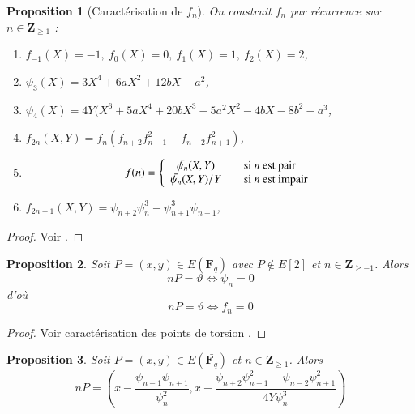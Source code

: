\documentclass{article}%
\theoremstyle{plain}
\theoremstyle{definition}
\theoremstyle{plain}
\newtheorem{proposition}{Proposition}[section]
\theoremstyle{plain}
\theoremstyle{remark}
\newcommand\fq{\mathbf{F}_{q}}
\begin{document}
\begin{proposition}[Caractérisation de $f_{n}$]
On construit $f_{n}$ par récurrence sur $n\in\mathbf{Z}_{\geq 1}$ :
\begin{enumerate}
\item $f_{-1}(X)=-1,\ f_{0}(X)=0,\ f_{1}(X)=1,\ f_{2}(X)=2$,
\item $\psi_{3}(X)=3X^{4} + 6aX^{2} + 12bX - a^{2}$,
\item $\psi_{4}(X)=4Y(X^{6} + 5aX^{4} + 20bX^{3} - 5a^{2}X^{2} - 4bX - 8b^{2} - a^{3}$,
\item $f_{2n}(X,Y)=f_{n}(f_{n+2}f_{n-1}^{2} - f_{n-2}f_{n+1}^{2})$,
\item $$
f(n) = \left\{ 
\begin{array}{cl cl}
  \bar{\psi_{n}}(X,Y) & \quad \text{si } n \text{ est pair}\\
  \bar{\psi_{n}}(X,Y)/Y & \quad \text{si } n \text{ est impair}\\ \end{array} \right.
$$
\item $f_{2n+1}(X,Y)=\psi_{n+2}\psi_{n}^{3} - \psi_{n+1}^{3}\psi_{n-1}$,
\end{enumerate}
\end{proposition}

\begin{proof}
Voir \cite{ref4}.
\end{proof}

\begin{proposition}
Soit $P=(x,y)\in E(\bar{\fq})$ avec $P\notin E[2]$ et $n\in\mathbf{Z}_{\geq -1}$. Alors 
\begin{equation}
nP = \vartheta \Longleftrightarrow \psi_{n} = 0
\label{np}
\end{equation}
d'où
\begin{equation}
nP = \vartheta \Longleftrightarrow f_{n} = 0
\label{np1}
\end{equation}
\end{proposition}

\begin{proof}
Voir caractérisation des points de torsion \cite{ref4}. 
\end{proof}

\begin{proposition}
Soit $P=(x,y)\in E(\bar{\fq})$ et $n\in\mathbf{Z}_{\geq 1}$. Alors 
\begin{equation}
nP = \left(x - \dfrac{\psi_{n - 1}\psi_{n + 1}}{\psi_{n}^{2}}, x - \dfrac{\psi_{n + 2}\psi_{n - 1}^{2} - \psi_{n - 2}\psi_{n + 1}^{2}}{4Y\psi_{n}^{3}}\right)
\label{np2}
\end{equation}
\end{proposition}
\end{document}
